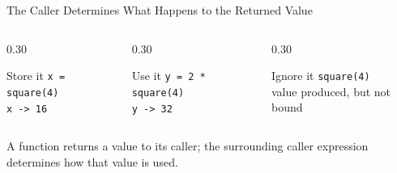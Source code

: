 \documentclass[aspectratio=169,10pt]{beamer}
\begin{document}
\begin{frame}{The Caller Determines What Happens to the Returned Value}
  \begin{columns}[T,onlytextwidth]
    \begin{column}{0.30\textwidth}
      \begin{block}{Store it}
        \texttt{x = square(4)}\\[0.08in]
        \texttt{x -> 16}
      \end{block}
    \end{column}

    \begin{column}{0.30\textwidth}
      \begin{block}{Use it}
        \texttt{y = 2 * square(4)}\\[0.08in]
        \texttt{y -> 32}
      \end{block}
    \end{column}

    \begin{column}{0.30\textwidth}
      \begin{block}{Ignore it}
        \texttt{square(4)}\\[0.08in]
        value produced, but not bound
      \end{block}
    \end{column}
  \end{columns}

  \begin{keyidea}
    A function returns a value to its caller; the surrounding caller expression determines how that value is used.
  \end{keyidea}
\end{frame}
\end{document}
